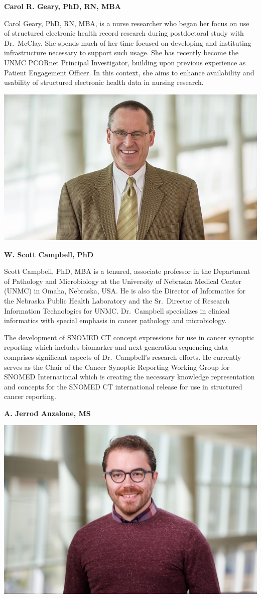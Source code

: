 \documentclass[
]{journal}
\begin{document}
\textbf{Carol R. Geary, PhD, RN, MBA}

Carol Geary, PhD, RN, MBA, is a nurse researcher who began her focus on use of structured electronic health record research during postdoctoral study with Dr.~McClay. She spends much of her time focused on developing and instituting infrastructure necessary to support such usage. She has recently become the UNMC PCORnet Principal Investigator, building upon previous experience as Patient Engagement Officer. In this context, she aims to enhance availability and usability of structured electronic health data in nursing research.

\begin{flushleft}\includegraphics[width=0.5\linewidth]{assets/biography/scott_campbell} \end{flushleft}

\textbf{W. Scott Campbell, PhD}

Scott Campbell, PhD, MBA is a tenured, associate professor in the Department of Pathology and Microbiology at the University of Nebraska Medical Center (UNMC) in Omaha, Nebraska, USA. He is also the Director of Informatics for the Nebraska Public Health Laboratory and the Sr.~Director of Research Information Technologies for UNMC. Dr.~Campbell specializes in clinical informatics with special emphasis in cancer pathology and microbiology.

The development of SNOMED CT concept expressions for use in cancer synoptic reporting which includes biomarker and next generation sequencing data comprises significant aspects of Dr.~Campbell's research efforts. He currently serves as the Chair of the Cancer Synoptic Reporting Working Group for SNOMED International which is creating the necessary knowledge representation and concepts for the SNOMED CT international release for use in structured cancer reporting.

\textbf{A. Jerrod Anzalone, MS}

\begin{flushleft}\includegraphics[width=0.5\linewidth]{assets/biography/jerrodanzalone} \end{flushleft}
\end{document}
